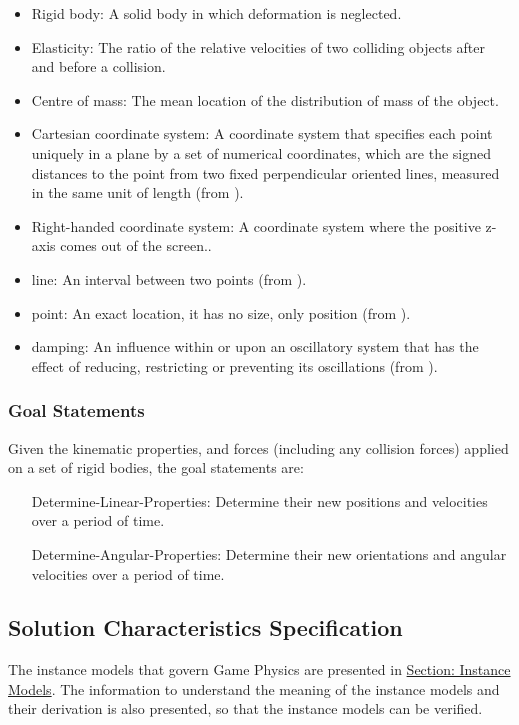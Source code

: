 \documentclass[12pt]{article}
\begin{document}
\begin{itemize}
\item{Rigid body: A solid body in which deformation is neglected.}
\item{Elasticity: The ratio of the relative velocities of two colliding objects after and before a collision.}
\item{Centre of mass: The mean location of the distribution of mass of the object.}
\item{Cartesian coordinate system: A coordinate system that specifies each point uniquely in a plane by a set of numerical coordinates, which are the signed distances to the point from two fixed perpendicular oriented lines, measured in the same unit of length (from \cite{cartesianWiki}).}
\item{Right-handed coordinate system: A coordinate system where the positive z-axis comes out of the screen..}
\item{line: An interval between two points (from \cite{lineSource}).}
\item{point: An exact location, it has no size, only position (from \cite{pointSource}).}
\item{damping: An influence within or upon an oscillatory system that has the effect of reducing, restricting or preventing its oscillations (from \cite{dampingSource}).}
\end{itemize}
\subsubsection{Goal Statements}
\label{Sec:GoalStmt}
Given the kinematic properties, and forces (including any collision forces) applied on a set of rigid bodies, the goal statements are:

\begin{itemize}
\item[Determine-Linear-Properties:\phantomsection\label{linearGS}]{Determine their new positions and velocities over a period of time.}
\item[Determine-Angular-Properties:\phantomsection\label{angularGS}]{Determine their new orientations and angular velocities over a period of time.}
\end{itemize}
\subsection{Solution Characteristics Specification}
\label{Sec:SolCharSpec}
The instance models that govern Game Physics are presented in \hyperref[Sec:IMs]{Section: Instance Models}. The information to understand the meaning of the instance models and their derivation is also presented, so that the instance models can be verified.
\end{document}
